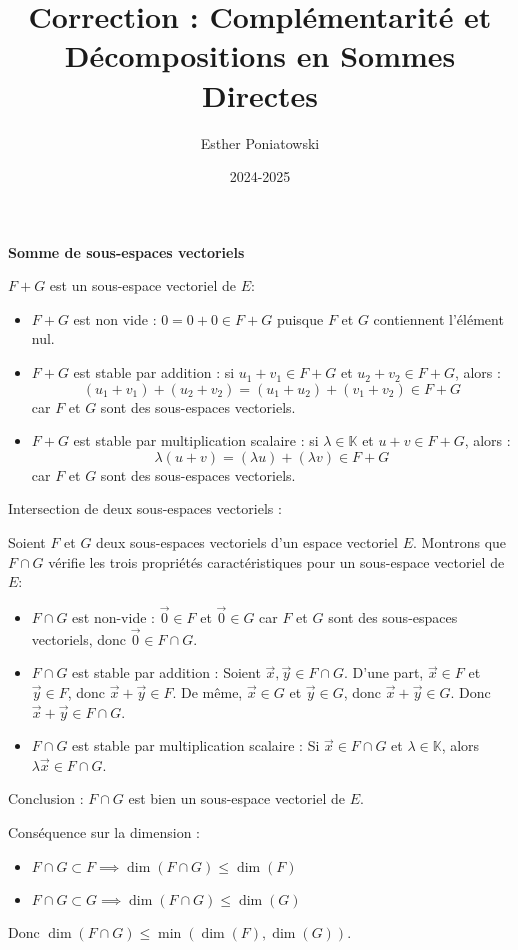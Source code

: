\documentclass[10pt,a4paper]{article}
\title{Correction : Complémentarité et Décompositions en Sommes Directes}
\author{Esther Poniatowski}
\date{2024-2025}
\begin{document}
\textbf{Somme de sous-espaces vectoriels}

\q $F+G$ est un sous-espace vectoriel de $E$:
\begin{itemize}
    \item $F+G$ est non vide : $0 = 0 + 0 \in F+G$ puisque $F$ et $G$ contiennent l'élément nul.
    \item  $F+G$ est stable par addition : si $u_1 + v_1 \in F+G$ et $u_2 + v_2 \in F+G$, alors :
   \[
   (u_1 + v_1) + (u_2 + v_2) = (u_1 + u_2) + (v_1 + v_2) \in F+G
   \]
   car $F$ et $G$ sont des sous-espaces vectoriels.
   \item $F+G$ est stable par multiplication scalaire : si $\lambda \in \mathbb{K}$ et $u + v \in
   F+G$, alors :
   \[
   \lambda (u + v) = (\lambda u) + (\lambda v) \in F+G
   \]
   car $F$ et $G$ sont des sous-espaces vectoriels.
\end{itemize}


\q Intersection de deux sous-espaces vectoriels :

Soient $F$ et $G$ deux sous-espaces vectoriels d'un espace vectoriel $E$. Montrons que $F \cap
G$ vérifie les trois propriétés caractéristiques pour un sous-espace vectoriel de $E$:
\begin{itemize}
    \item $F \cap G$ est non-vide : $\vec{0} \in F$ et $\vec{0} \in G$ car $F$ et $G$
    sont des sous-espaces vectoriels, donc $\vec{0} \in F \cap G$.
    \item $F \cap G$ est stable par addition : Soient $\vec{x}, \vec{y} \in F \cap G$. D'une part,
    $\vec{x} \in F$ et $\vec{y} \in F$, donc $\vec{x} + \vec{y} \in F$. De même, $\vec{x} \in G$ et
    $\vec{y} \in G$, donc $\vec{x} + \vec{y} \in G$. Donc $\vec{x} + \vec{y} \in F \cap G$.
    \item $F \cap G$ est stable par multiplication scalaire : Si $\vec{x} \in F \cap G$ et $\lambda
    \in \mathbb{K}$, alors $\lambda\vec{x} \in F \cap G$.
\end{itemize}

Conclusion : $F \cap G$ est bien un sous-espace vectoriel de $E$.

Conséquence sur la dimension :
\begin{itemize}
    \item $F \cap G \subset F \implies \dim(F \cap G) \leq \dim(F)$
    \item $F \cap G \subset G \implies \dim(F \cap G) \leq \dim(G)$
\end{itemize}
Donc $\dim(F \cap G) \leq \min(\dim(F), \dim(G))$.
\end{document}
